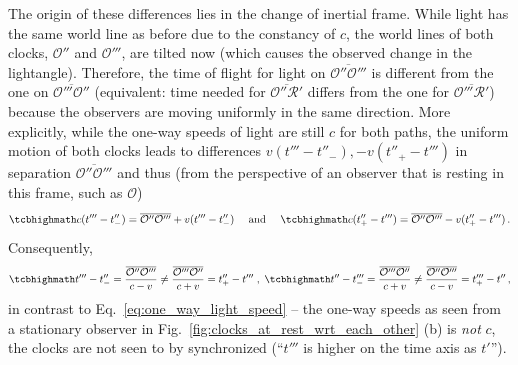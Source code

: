\documentclass[../relativity_main.tex]{subfiles}
\begin{document}
The origin of these differences lies in the change of inertial frame. While light has the same world line as before due to the constancy of $c$, the world lines of both clocks, $\mathcal{O}''$ and $\mathcal{O}'''$, are tilted now (which causes the observed change in the lightangle). Therefore, the time of flight for light on $\overline{\mathcal{O}'' \mathcal{O}'''}$ is different from the one on $\overline{\mathcal{O}''' \mathcal{O}''}$ (equivalent: time needed for $\overline{\mathcal{O}'' \mathcal{R}'}$ differs from the one for $\overline{\mathcal{O}''' \mathcal{R}'}$) because the observers are moving uniformly in the same direction. More explicitly, while the one-way speeds of light are still $c$ for both paths, the uniform motion of both clocks leads to differences $v (t''' - t''_-), -v (t''_+ - t''')$ in separation $\overline{\mathcal{O}'' \mathcal{O}'''}$ and thus (from the perspective of an observer that is resting in this frame, such as $\mathcal{O}$)
\begin{equation}\label{eq:one_way_light_speed_v2}
	\eqbox{
	c (t''' - t''_-) = \overline{\mathcal{O}'' \mathcal{O}'''} + v (t''' - t''_-)
	}
	\quad \text{ and } \quad
	\eqbox{
	c (t''_+ - t''') = \overline{\mathcal{O}'' \mathcal{O}'''} - v (t''_+ - t''')
	} \, .
\end{equation}
Consequently,
\begin{align}
	\eqbox{
	t''' - t''_- = \frac{\overline{\mathcal{O}'' \mathcal{O}'''}}{c - v} \neq \frac{\overline{\mathcal{O}''' \mathcal{O}''}}{c + v} = t''_+ - t'''
	}
	\; , \;
	\eqbox{
	t'' - t'''_- = \frac{\overline{\mathcal{O}''' \mathcal{O}''}}{c + v} \neq \frac{\overline{\mathcal{O}'' \mathcal{O}'''}}{c - v} = t'''_+ - t''
	} \, ,
\end{align}
in contrast to Eq.~\eqref{eq:one_way_light_speed} -- the one-way speeds as seen from a stationary observer in Fig.~\ref{fig:clocks_at_rest_wrt_each_other} (b) is \emph{not} $c$, the clocks are not seen to by synchronized (\enquote{$t'''$ is higher on the time axis as $t'$}).
\end{document}
